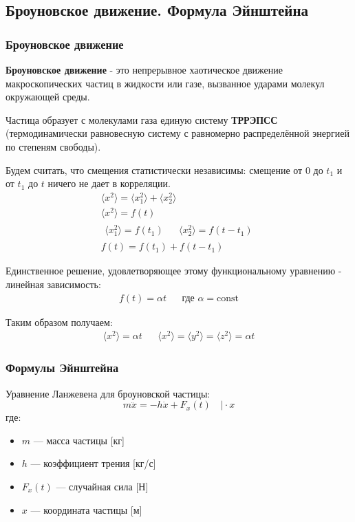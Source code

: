 \subsection{Броуновское движение. Формула Эйнштейна}
\subsubsection*{Броуновское движение}
\textbf{Броуновское движение} - это непрерывное хаотическое движение макроскопических частиц в жидкости или газе, вызванное ударами молекул окружающей среды.

Частица образует с молекулами газа единую систему \textbf{ТРРЭПСС} (термодинамически равновесную систему с равномерно распределённой энергией по степеням свободы).

Будем считать, что смещения статистически независимы: смещение от $0$ до $t_1$ и от $t_1$ до $t$ ничего не дает в корреляции.
\begin{gather*}
	\langle x^2 \rangle = \langle x_1^2\rangle + \langle x_2^2\rangle\\
	\langle x^2 \rangle = f(t) \\
	\begin{aligned}
		\langle x_1^2 \rangle = f(t_1) && \langle x_2^2 \rangle = f(t - t_1)
	\end{aligned}\\
	f(t) = f(t_1) + f(t - t_1)
\end{gather*}

Единственное решение, удовлетворяющее этому функциональному уравнению - линейная зависимость:
\begin{align*}
	f(t) = \alpha t && \text{где } \alpha = \text{const}
\end{align*}

Таким образом получаем:
\begin{align*}
	\langle x^2 \rangle = \alpha t && \langle x^2\rangle = \langle y^2\rangle = \langle z^2 \rangle = \alpha t
\end{align*}


\subsubsection*{Формулы Эйнштейна}
Уравнение Ланжевена для броуновской частицы:
\[ m\ddot{x} = -h\dot{x} + F_x(t) \quad \Big|\cdot x \]
где:
\begin{itemize}
	\item $m$ — масса частицы [кг]
	\item $h$ — коэффициент трения [кг/с]
	\item $F_x(t)$ — случайная сила [Н]
	\item $x$ — координата частицы [м]
\end{itemize}

